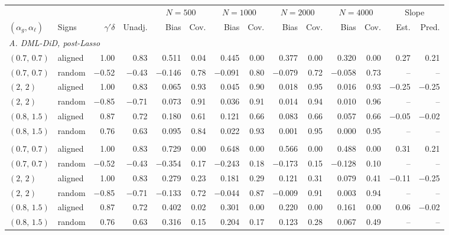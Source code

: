 \begin{tabular}{ll rr rr rr rr rr r r}
\toprule
 & & & & \multicolumn{2}{c}{$N=500$} & \multicolumn{2}{c}{$N=1000$} & \multicolumn{2}{c}{$N=2000$} & \multicolumn{2}{c}{$N=4000$} & \multicolumn{2}{c}{Slope} \\
\cmidrule(lr){5-6} \cmidrule(lr){7-8} \cmidrule(lr){9-10} \cmidrule(lr){11-12} \cmidrule(lr){13-14}
$(\alpha_g,\alpha_\ell)$ & Signs & $\gamma'\delta$ & Unadj. & Bias & Cov. & Bias & Cov. & Bias & Cov. & Bias & Cov. & Est. & Pred. \\
\midrule
\multicolumn{14}{l}{\emph{A. DML-DiD, post-Lasso}} \\
$(0.7,\,0.7)$ & aligned & 1.00 & 0.83 & 0.511 & 0.04 & 0.445 & 0.00 & 0.377 & 0.00 & 0.320 & 0.00 & 0.27 & 0.21 \\
$(0.7,\,0.7)$ & random & $-$0.52 & $-$0.43 & $-$0.146 & 0.78 & $-$0.091 & 0.80 & $-$0.079 & 0.72 & $-$0.058 & 0.73 & -- & -- \\
$(2,\,2)$ & aligned & 1.00 & 0.83 & 0.065 & 0.93 & 0.045 & 0.90 & 0.018 & 0.95 & 0.016 & 0.93 & $-$0.25 & $-$0.25 \\
$(2,\,2)$ & random & $-$0.85 & $-$0.71 & 0.073 & 0.91 & 0.036 & 0.91 & 0.014 & 0.94 & 0.010 & 0.96 & -- & -- \\
$(0.8,\,1.5)$ & aligned & 0.87 & 0.72 & 0.180 & 0.61 & 0.121 & 0.66 & 0.083 & 0.66 & 0.057 & 0.66 & $-$0.05 & $-$0.02 \\
$(0.8,\,1.5)$ & random & 0.76 & 0.63 & 0.095 & 0.84 & 0.022 & 0.93 & 0.001 & 0.95 & 0.000 & 0.95 & -- & -- \\
\addlinespace
\multicolumn{14}{l}{\emph{B. DML-DiD, Lasso (no refit)}} \\
$(0.7,\,0.7)$ & aligned & 1.00 & 0.83 & 0.729 & 0.00 & 0.648 & 0.00 & 0.566 & 0.00 & 0.488 & 0.00 & 0.31 & 0.21 \\
$(0.7,\,0.7)$ & random & $-$0.52 & $-$0.43 & $-$0.354 & 0.17 & $-$0.243 & 0.18 & $-$0.173 & 0.15 & $-$0.128 & 0.10 & -- & -- \\
$(2,\,2)$ & aligned & 1.00 & 0.83 & 0.279 & 0.23 & 0.181 & 0.29 & 0.121 & 0.31 & 0.079 & 0.41 & $-$0.11 & $-$0.25 \\
$(2,\,2)$ & random & $-$0.85 & $-$0.71 & $-$0.133 & 0.72 & $-$0.044 & 0.87 & $-$0.009 & 0.91 & 0.003 & 0.94 & -- & -- \\
$(0.8,\,1.5)$ & aligned & 0.87 & 0.72 & 0.402 & 0.02 & 0.301 & 0.00 & 0.220 & 0.00 & 0.161 & 0.00 & 0.06 & $-$0.02 \\
$(0.8,\,1.5)$ & random & 0.76 & 0.63 & 0.316 & 0.15 & 0.204 & 0.17 & 0.123 & 0.28 & 0.067 & 0.49 & -- & -- \\
\bottomrule
\end{tabular}
